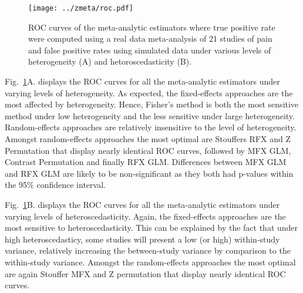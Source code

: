 \documentclass[preprint]{elsarticle}
\begin{document}
\begin{figure}[h]
	\centering
 	\texttt{[image: ../zmeta/roc.pdf]}
	\caption{ROC curves of the meta-analytic estimators where true positive rate were computed using a real data meta-analysis of 21 studies of pain and false positive rates using simulated data under various levels of heterogeneity (A) and hetoroscedasticity (B).}
	\label{fig_realdata}
\end{figure}


Fig.~\ref{fig_realdata}A. displays the ROC curves for all the meta-analytic estimators under varying levels of heterogeneity. As expected, the fixed-effects approaches are the most affected by heterogeneity. Hence, Fisher's method is both the most sensitive method under low heterogeneity and the less sensitive under large heterogeneity. Random-effects approaches are relatively insensitive to the level of heterogeneity. Amongst random-effects approaches the most optimal are Stouffers RFX and Z Permutation that display nearly identical ROC curves, followed by MFX GLM, Contrast Permutation and finally RFX GLM. Differences between MFX GLM and RFX GLM are likely to be non-significant as they both had p-values within the 95\% confidence interval.

Fig.~\ref{fig_realdata}B. displays the ROC curves for all the meta-analytic estimators under varying levels of heteroscedasticity. Again, the fixed-effects approaches are the most sensitive to heteroscedasticity. This can be explained by the fact that under high heteroscedasticy, some studies will present a low (or high) within-study variance, relatively increasing the between-study variance by comparison to the within-study variance. Amongst the random-effects approaches the most optimal are again Stouffer MFX and Z permutation that display nearly identical ROC curves. 

\end{document}
